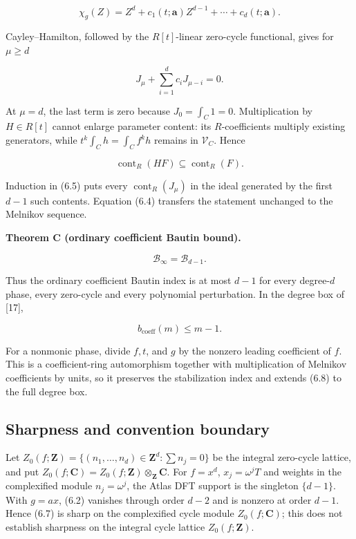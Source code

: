 \documentclass[
  11pt,
  a4paper,
]{amsart}
\begin{document}
\[
\chi_g(Z)=Z^d+c_1(t;\boldsymbol a)Z^{d-1}
+\cdots+c_d(t;\boldsymbol a).
\]

Cayley--Hamilton, followed by the \(R[t]\)-linear zero-cycle functional,
gives for \(\mu\ge d\)

\[
J_\mu+\sum_{i=1}^dc_iJ_{\mu-i}=0.                   \tag{6.5}
\]

At \(\mu=d\), the last term is zero because \(J_0=\int_C1=0\).
Multiplication by \(H\in R[t]\) cannot enlarge parameter content: its
\(R\)-coefficients multiply existing generators, while
\(t^k\int_Ch=\int_Cf^kh\) remains in \(\mathcal V_C\). Hence

\[
\operatorname{cont}_R(HF)\subseteq\operatorname{cont}_R(F).       \tag{6.6}
\]

Induction in (6.5) puts every \(\operatorname{cont}_R(J_\mu)\) in the
ideal generated by the first \(d-1\) such contents. Equation (6.4)
transfers the statement unchanged to the Melnikov sequence.

\textbf{Theorem C (ordinary coefficient Bautin bound).}

\[
\boxed{\mathcal B_\infty=\mathcal B_{d-1}.}           \tag{6.7}
\]

Thus the ordinary coefficient Bautin index is at most \(d-1\) for every
degree-\(d\) phase, every zero-cycle and every polynomial perturbation.
In the degree box of {[}17{]},

\[
\boxed{b_{\mathrm{coeff}}(m)\le m-1.}                 \tag{6.8}
\]

For a nonmonic phase, divide \(f,t\), and \(g\) by the nonzero leading
coefficient of \(f\). This is a coefficient-ring automorphism together
with multiplication of Melnikov coefficients by units, so it preserves
the stabilization index and extends (6.8) to the full degree box.

\subsection{Sharpness and convention boundary}

Let \(Z_0(f;\mathbf Z)=\{(n_1,\ldots,n_d)\in\mathbf Z^d:\sum n_j=0\}\)
be the integral zero-cycle lattice, and put
\(Z_0(f;\mathbf C)=Z_0(f;\mathbf Z)\otimes_{\mathbf Z}\mathbf C\). For
\(f=x^d\), \(x_j=\omega^jT\) and weights in the complexified module
\(n_j=\omega^j\), the Atlas DFT support is the singleton \(\{d-1\}\).
With \(g=ax\), (6.2) vanishes through order \(d-2\) and is nonzero at
order \(d-1\). Hence (6.7) is sharp on the complexified cycle module
\(Z_0(f;\mathbf C)\); this does not establish sharpness on the integral
cycle lattice \(Z_0(f;\mathbf Z)\).
\end{document}
